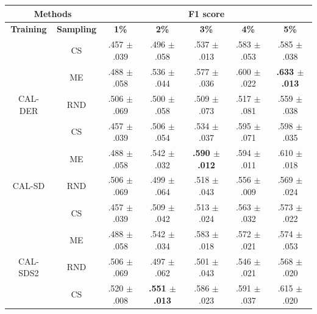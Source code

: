\begin{table}[htbp]
\centering

\begin{tabular*}{\linewidth}{c|c|@{\extracolsep{\fill}}ccccc}
\toprule
\multicolumn{2}{c|}{\textbf{Methods}} & \multicolumn{5}{c}{\textbf{F1 score}} \\
\midrule
\textbf{Training} & \textbf{Sampling} & \textbf{1\%} & \textbf{2\%} & \textbf{3\%} & \textbf{4\%} & \textbf{5\%}\\
\midrule
 & CS & .457 $\pm$ {\small .039} & .496 $\pm$ {\small .058} & .537 $\pm$ {\small .013} & .583 $\pm$ {\small .053} & .585 $\pm$ {\small .038}\\

 & ME & .488 $\pm$ {\small .058} & .536 $\pm$ {\small .044} & .577 $\pm$ {\small .036} & .600 $\pm$ {\small .022} & \textbf{.633 $\pm$ {\small .013}}\\

\multirow{-3}{*}{\raggedright\arraybackslash CAL-DER} & RND & .506 $\pm$ {\small .069} & .500 $\pm$ {\small .058} & .509 $\pm$ {\small .073} & .517 $\pm$ {\small .081} & .559 $\pm$ {\small .038}\\
\midrule
 & CS & .457 $\pm$ {\small .039} & .506 $\pm$ {\small .054} & .534 $\pm$ {\small .037} & .595 $\pm$ {\small .071} & .598 $\pm$ {\small .035}\\

 & ME & .488 $\pm$ {\small .058} & .542 $\pm$ {\small .032} & \textbf{.590 $\pm$ {\small .012}} & .594 $\pm$ {\small .011} & .610 $\pm$ {\small .018}\\

\multirow{-3}{*}{\raggedright\arraybackslash CAL-SD} & RND & .506 $\pm$ {\small .069} & .499 $\pm$ {\small .064} & .518 $\pm$ {\small .043} & .556 $\pm$ {\small .009} & .569 $\pm$ {\small .024}\\
\midrule
 & CS & .457 $\pm$ {\small .039} & .509 $\pm$ {\small .042} & .513 $\pm$ {\small .024} & .563 $\pm$ {\small .032} & .573 $\pm$ {\small .022}\\

 & ME & .488 $\pm$ {\small .058} & .542 $\pm$ {\small .034} & .583 $\pm$ {\small .018} & .572 $\pm$ {\small .021} & .574 $\pm$ {\small .053}\\

\multirow{-3}{*}{\raggedright\arraybackslash CAL-SDS2} & RND & .506 $\pm$ {\small .069} & .497 $\pm$ {\small .062} & .501 $\pm$ {\small .043} & .546 $\pm$ {\small .021} & .568 $\pm$ {\small .020}\\
\midrule
 & CS & .520 $\pm$ {\small .008} & \textbf{.551 $\pm$ {\small .013}} & .586 $\pm$ {\small .023} & .591 $\pm$ {\small .037} & .615 $\pm$ {\small .020}\\


\end{tabular*}
\end{table}
